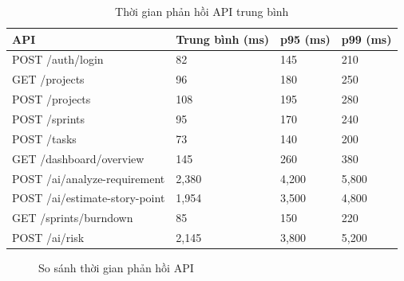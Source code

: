 \documentclass[12pt,a4paper]{report}
\begin{document}
\begin{table}[H]
\centering
\caption{Thời gian phản hồi API trung bình}
\begin{tabular}{|p{5cm}|p{3cm}|p{3cm}|p{3cm}|}
\hline
\textbf{API} & \textbf{Trung bình (ms)} & \textbf{p95 (ms)} & \textbf{p99 (ms)} \\
\hline
POST /auth/login & 82 & 145 & 210 \\
\hline
GET /projects & 96 & 180 & 250 \\
\hline
POST /projects & 108 & 195 & 280 \\
\hline
POST /sprints & 95 & 170 & 240 \\
\hline
POST /tasks & 73 & 140 & 200 \\
\hline
GET /dashboard/overview & 145 & 260 & 380 \\
\hline
POST /ai/analyze-requirement & 2,380 & 4,200 & 5,800 \\
\hline
POST /ai/estimate-story-point & 1,954 & 3,500 & 4,800 \\
\hline
GET /sprints/burndown & 85 & 150 & 220 \\
\hline
POST /ai/risk & 2,145 & 3,800 & 5,200 \\
\hline
\end{tabular}
\label{tab:api_response_time}
\end{table}

\begin{figure}[H]
\centering
{}
\caption{So sánh thời gian phản hồi API}
\label{fig:api_response_chart}
\end{figure}
\end{document}

